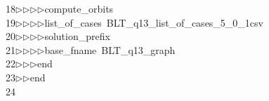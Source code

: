 \begin{tabbing}
18\>$\triangleright$\>$\triangleright$\>$\triangleright$\>$\triangleright$\>compute\_orbits\ \\[0pt]
19\>$\triangleright$\>$\triangleright$\>$\triangleright$\>$\triangleright$\>list\_of\_cases\ BLT\_q13\_list\_of\_cases\_5\_0\_1csv\ \\[0pt]
20\>$\triangleright$\>$\triangleright$\>$\triangleright$\>$\triangleright$\>solution\_prefix\ \ \\[0pt]
21\>$\triangleright$\>$\triangleright$\>$\triangleright$\>$\triangleright$\>base\_fname\ BLT\_q13\_graph\ \\[0pt]
22\>$\triangleright$\>$\triangleright$\>$\triangleright$\>end\ \\[0pt]
23\>$\triangleright$\>$\triangleright$\>end\\[0pt]
24\>\end{tabbing}
